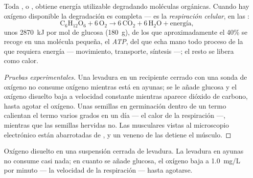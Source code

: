 \begin{proposition}\label{prop:g10:cell-metabolism:respiration}
Toda ,  o , obtiene energía utilizable
degradando moléculas orgánicas. Cuando hay oxígeno disponible la
degradación es completa --- es la \emph{respiración
celular}, en las :
\[
\mathrm{C_6H_{12}O_6} + 6\,\mathrm{O_2} \longrightarrow
6\,\mathrm{CO_2} + 6\,\mathrm{H_2O} + \text{energía},
\]
unos \qty{2870}{kJ} por mol de glucosa (\qty{180}{g}), de los que
aproximadamente el 40\% se recoge en una molécula pequeña, el
\emph{ATP}, del que echa mano todo proceso de la  que
requiera energía --- movimiento, transporte, síntesis ---; el resto se
libera como calor.
\end{proposition}
\begin{proof}[Pruebas experimentales]
Una levadura en un recipiente cerrado con una sonda de oxígeno no
consume oxígeno mientras está en ayunas; se le añade glucosa y el
oxígeno disuelto baja a velocidad constante mientras aparece dióxido de
carbono, hasta agotar el oxígeno. Unas semillas en germinación dentro
de un termo calientan el termo varios grados en un día --- el calor de
la respiración ---, mientras que las semillas hervidas no. Las 
musculares vistas al microscopio electrónico están abarrotadas de
, y un veneno de las  detiene el músculo.
\end{proof}

\begin{omfigure}

{\small Oxígeno disuelto en una suspensión cerrada de levadura. La
levadura en ayunas no consume casi nada; en cuanto se añade glucosa, el
oxígeno baja a \qty{1.0}{mg/L} por minuto --- la velocidad de la
respiración --- hasta agotarse.}
\end{omfigure}

